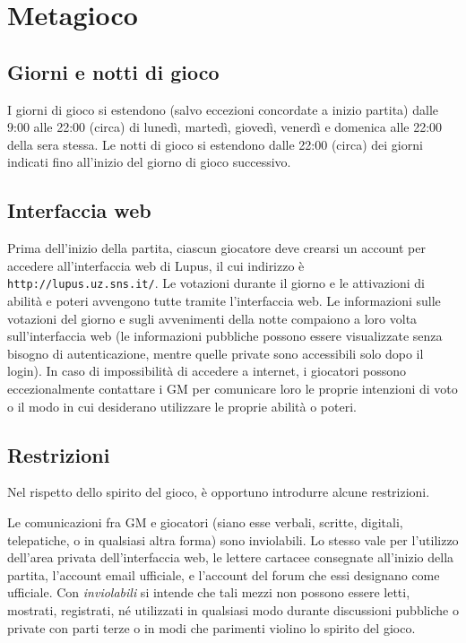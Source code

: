 \documentclass[a4paper,10pt]{article}
\begin{document}
\pagebreak

\section{Metagioco}

\subsection{Giorni e notti di gioco}

I giorni di gioco si estendono (salvo eccezioni concordate a inizio partita) dalle 9:00 alle 22:00 (circa) di lunedì, martedì, giovedì, venerdì e domenica alle 22:00 della sera stessa. Le notti di gioco si estendono dalle 22:00 (circa) dei giorni indicati fino all'inizio del giorno di gioco successivo. 

\subsection{Interfaccia web}

Prima dell'inizio della partita, ciascun giocatore deve crearsi un account per accedere all'interfaccia web di Lupus, il cui indirizzo è \verb|http://lupus.uz.sns.it/|.
Le votazioni durante il giorno e le attivazioni di abilità e poteri avvengono tutte tramite l'interfaccia web. Le informazioni sulle votazioni del giorno e sugli avvenimenti della notte compaiono a loro volta sull'interfaccia web (le informazioni pubbliche possono essere visualizzate senza bisogno di autenticazione, mentre quelle private sono accessibili solo dopo il login). In caso di impossibilità di accedere a internet, i giocatori possono eccezionalmente contattare i GM per comunicare loro le proprie intenzioni di voto o il modo in cui desiderano utilizzare le proprie abilità o poteri.

\subsection{Restrizioni}

Nel rispetto dello spirito del gioco, è opportuno introdurre alcune restrizioni.

Le comunicazioni fra GM e giocatori (siano esse verbali, scritte, digitali, telepatiche, o in qualsiasi altra forma) sono inviolabili. Lo stesso vale per l'utilizzo dell'area privata dell'interfaccia web, le lettere cartacee consegnate all'inizio della partita, l'account email ufficiale, e l'account del forum che essi designano come ufficiale.
Con \emph{inviolabili} si intende che tali mezzi non possono essere letti, mostrati, registrati, né utilizzati in qualsiasi modo durante discussioni pubbliche o private con parti terze o in modi che parimenti violino lo spirito del gioco.
\end{document}
